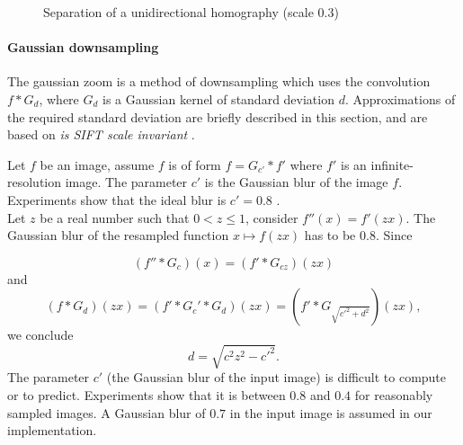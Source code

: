 \begin{figure}[h!]
\caption{Separation of a unidirectional homography (scale $0.3$) }
\label{image_separation_f14}
\end{figure}

\paragraph{Gaussian downsampling}
\label{zoom_gaussien}
The gaussian zoom is a method of downsampling which uses the convolution $f*G_{d}$, where $G_d$ is a Gaussian kernel of standard deviation $d$. Approximations of the required standard deviation are briefly described in this section, and are based on \emph{is SIFT scale invariant} \cite{morel2011sift}.


Let $f$ be an image, assume $f$ is of form $f=G_{c'} * f'$ where $f'$ is an infinite-resolution image. The parameter $c'$ is the Gaussian blur of the image $f$. Experiments show that the ideal blur is $c'=0.8$ \cite{morel2011sift}.\\
Let $z$ be a real number such that $0<z\le 1$, consider $f''(x)=f'(zx)$.
The Gaussian blur of the resampled function $x\mapsto f(zx)$ has to be $0.8$. Since

\begin{equation*}
(f''*G_{c})(x)=(f'*G_{cz})(zx)
\end{equation*}
and 
\begin{equation*}
(f*G_d)(zx)=(f'*G_c'*G_d)(zx)=(f'*G_{\sqrt{c'^2 + d^2}})(zx),
\end{equation*}
we conclude
\begin{equation}
d=\sqrt{c^2 z^2 - c'^2}.
\label{formule_zoom_gaussien}
\end{equation}
The parameter $c'$ (the Gaussian blur of the input image) is difficult to compute or to predict. Experiments show that it is between $0.8$ and $0.4$ for reasonably sampled images. A Gaussian blur of $0.7$ in the input image is assumed in our implementation.


